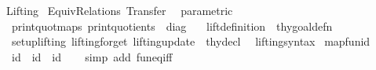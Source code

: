 %
\begin{isabellebody}%
%
%
\isadelimdocument
%
\endisadelimdocument
%
\isatagdocument
%
\isamarkuptrue%
%
\endisatagdocument
{\isafolddocument}%
%
\isadelimdocument
%
\endisadelimdocument
%
\isadelimtheory
%
\endisadelimtheory
%
\isatagtheory
{}\isamarkupfalse%
\ Lifting\isanewline
{}\ Equiv{\isacharunderscore}{\kern0pt}Relations\ Transfer\isanewline
{}\isanewline
\ \ {\isachardoublequoteopen}parametric{\isachardoublequoteclose}\ \isanewline
\ \ {\isachardoublequoteopen}print{\isacharunderscore}{\kern0pt}quot{\isacharunderscore}{\kern0pt}maps{\isachardoublequoteclose}\ {\isachardoublequoteopen}print{\isacharunderscore}{\kern0pt}quotients{\isachardoublequoteclose}\ {\isacharcolon}{\kern0pt}{\isacharcolon}{\kern0pt}\ diag\ \isanewline
\ \ {\isachardoublequoteopen}lift{\isacharunderscore}{\kern0pt}definition{\isachardoublequoteclose}\ {\isacharcolon}{\kern0pt}{\isacharcolon}{\kern0pt}\ thy{\isacharunderscore}{\kern0pt}goal{\isacharunderscore}{\kern0pt}defn\ \isanewline
\ \ {\isachardoublequoteopen}setup{\isacharunderscore}{\kern0pt}lifting{\isachardoublequoteclose}\ {\isachardoublequoteopen}lifting{\isacharunderscore}{\kern0pt}forget{\isachardoublequoteclose}\ {\isachardoublequoteopen}lifting{\isacharunderscore}{\kern0pt}update{\isachardoublequoteclose}\ {\isacharcolon}{\kern0pt}{\isacharcolon}{\kern0pt}\ thy{\isacharunderscore}{\kern0pt}decl\isanewline
{}%
\endisatagtheory
{\isafoldtheory}%
%
\isadelimtheory
%
\endisadelimtheory
%
\isadelimdocument
%
\endisadelimdocument
%
\isatagdocument
%
\isamarkuptrue%
%
\endisatagdocument
{\isafolddocument}%
%
\isadelimdocument
%
\endisadelimdocument
{}\isamarkupfalse%
\ \ lifting{\isacharunderscore}{\kern0pt}syntax\isanewline
{}\isanewline
\isanewline
{}\isamarkupfalse%
\ map{\isacharunderscore}{\kern0pt}fun{\isacharunderscore}{\kern0pt}id{\isacharcolon}{\kern0pt}\isanewline
\ \ {\isachardoublequoteopen}{\isacharparenleft}{\kern0pt}id\ {\isacharminus}{\kern0pt}{\isacharminus}{\kern0pt}{\isacharminus}{\kern0pt}{\isachargreater}{\kern0pt}\ id{\isacharparenright}{\kern0pt}\ {\isacharequal}{\kern0pt}\ id{\isachardoublequoteclose}\isanewline
%
\isadelimproof
\ \ %
\endisadelimproof
%
\isatagproof
{}\isamarkupfalse%
\ {\isacharparenleft}{\kern0pt}simp\ add{\isacharcolon}{\kern0pt}\ fun{\isacharunderscore}{\kern0pt}eq{\isacharunderscore}{\kern0pt}iff{\isacharparenright}{\kern0pt}%

\end{isabellebody}
